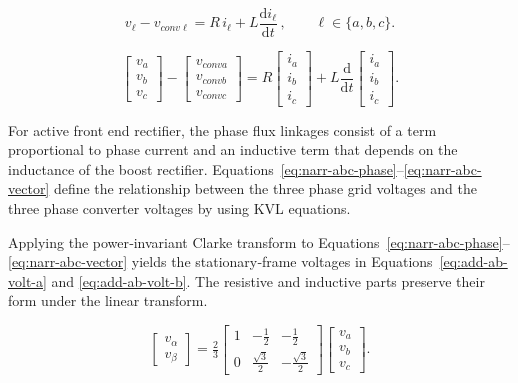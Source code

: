 \begin{equation}
\label{eq:narr-abc-phase}
v_\ell - v_{conv\ell} = R\, i_\ell + L\frac{\mathrm di_\ell}{\mathrm d t} \,, \qquad \ell \in \{a,b,c\} .
\end{equation}



\begin{equation}
\label{eq:narr-abc-vector}
\begin{bmatrix} v_a \\ v_b \\ v_c \end{bmatrix} - 
\begin{bmatrix} v_{conva} \\ v_{convb} \\ v_{convc} \end{bmatrix}
= R \begin{bmatrix} i_a \\ i_b \\ i_c \end{bmatrix}
+ L\frac{\mathrm d}{\mathrm d t} \begin{bmatrix} i_a \\ i_b \\ i_c \end{bmatrix} .
\end{equation}



For active front end rectifier, the phase flux linkages consist of a  term proportional to phase current and an inductive term that depends on the inductance of the boost rectifier. Equations~\eqref{eq:narr-abc-phase}–\eqref{eq:narr-abc-vector} define the relationship between the three phase grid voltages and the three phase converter voltages by using KVL equations.



Applying the power‑invariant Clarke transform to Equations~\eqref{eq:narr-abc-phase}–\eqref{eq:narr-abc-vector} yields the stationary‑frame voltages in Equations~\eqref{eq:add-ab-volt-a} and \eqref{eq:add-ab-volt-b}. The resistive and inductive parts preserve their form under the linear transform. 



\begin{equation}
\label{eq:narr-clarke}
\begin{bmatrix} v_\alpha \\ v_\beta \end{bmatrix}
= \tfrac{2}{3}
\begin{bmatrix}
1 & -\tfrac{1}{2} & -\tfrac{1}{2} \\
0 & \tfrac{\sqrt 3}{2} & -\tfrac{\sqrt 3}{2}
\end{bmatrix}
\begin{bmatrix} v_a \\ v_b \\ v_c \end{bmatrix} .
\end{equation}



